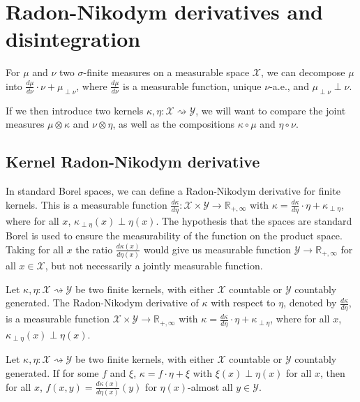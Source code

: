 \chapter{Radon-Nikodym derivatives and disintegration}
\label{app:rnDeriv}

For $\mu$ and $\nu$ two $\sigma$-finite measures on a measurable space $\mathcal{X}$, we can decompose $\mu$ into $\frac{d \mu}{d \nu} \cdot \nu + \mu_{\perp \nu}$, where $\frac{d \mu}{d \nu}$ is a measurable function, unique $\nu$-a.e., and $\mu_{\perp \nu} \perp \nu$.

If we then introduce two kernels $\kappa, \eta : \mathcal X \rightsquigarrow \mathcal Y$, we will want to compare the joint measures $\mu \otimes \kappa$ and $\nu \otimes \eta$, as well as the compositions $\kappa \circ \mu$ and $\eta \circ \nu$.


\section{Kernel Radon-Nikodym derivative}

In standard Borel spaces, we can define a Radon-Nikodym derivative for finite kernels.
This is a measurable function $\frac{d \kappa}{d \eta} : \mathcal X \times \mathcal Y \to \mathbb{R}_{+, \infty}$ with $\kappa = \frac{d \kappa}{d \eta} \cdot \eta + \kappa_{\perp \eta}$, where for all $x$, $\kappa_{\perp \eta}(x) \perp \eta(x)$.
The hypothesis that the spaces are standard Borel is used to ensure the measurability of the function on the product space.
Taking for all $x$ the ratio $\frac{d \kappa(x)}{d \eta(x)}$ would give us measurable function $\mathcal Y \to \mathbb{R}_{+, \infty}$ for all $x \in \mathcal X$, but not necessarily a jointly measurable function.

\begin{definition}
  \label{def:kernel_rnDeriv}
  \mathlibok
  Let $\kappa, \eta : \mathcal X \rightsquigarrow \mathcal Y$ be two finite kernels, with either $\mathcal X$ countable or $\mathcal{Y}$ countably generated. The Radon-Nikodym derivative of $\kappa$ with respect to $\eta$, denoted by $\frac{d \kappa}{d \eta}$, is a measurable function $\mathcal X \times \mathcal Y \to \mathbb{R}_{+, \infty}$ with $\kappa = \frac{d \kappa}{d \eta} \cdot \eta + \kappa_{\perp \eta}$, where for all $x$, $\kappa_{\perp \eta}(x) \perp \eta(x)$.
\end{definition}


\begin{lemma}
  \label{lem:rnDeriv_unique}
  \mathlibok
  Let $\kappa, \eta : \mathcal X \rightsquigarrow \mathcal Y$ be two finite kernels, with either $\mathcal X$ countable or $\mathcal{Y}$ countably generated. If for some $f$ and $\xi$, $\kappa = f \cdot \eta + \xi$ with $\xi(x) \perp \eta(x)$ for all $x$, then for all $x$, $f(x, y) = \frac{d \kappa(x)}{d \eta(x)}(y)$ for $\eta(x)$-almost all $y \in \mathcal Y$.
\end{lemma}

